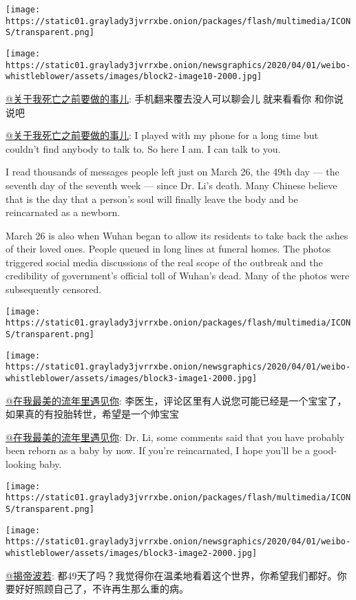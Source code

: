 \texttt{[image: https://static01.graylady3jvrrxbe.onion/packages/flash/multimedia/ICONS/transparent.png]}

\texttt{[image: https://static01.graylady3jvrrxbe.onion/newsgraphics/2020/04/01/weibo-whistleblower/assets/images/block2-image10-2000.jpg]}

\href{https://www.weibo.com/u/6036501960}{@关于我死亡之前要做的事儿}:
手机翻来覆去没人可以聊会儿 就来看看你 和你说说吧

\href{https://www.weibo.com/u/6036501960}{@关于我死亡之前要做的事儿}: I
played with my phone for a long time but couldn't find anybody to talk
to. So here I am. I can talk to you.

I read thousands of messages people left just on March 26, the 49th day
--- the seventh day of the seventh week --- since Dr. Li's death. Many
Chinese believe that is the day that a person's soul will finally leave
the body and be reincarnated as a newborn.

March 26 is also when Wuhan began to allow its residents to take back
the ashes of their loved ones. People queued in long lines at funeral
homes. The photos triggered social media discussions of the real scope
of the outbreak and the credibility of government's official toll of
Wuhan's dead. Many of the photos were subsequently censored.

\texttt{[image: https://static01.graylady3jvrrxbe.onion/packages/flash/multimedia/ICONS/transparent.png]}

\texttt{[image: https://static01.graylady3jvrrxbe.onion/newsgraphics/2020/04/01/weibo-whistleblower/assets/images/block3-image1-2000.jpg]}

\href{https://www.weibo.com/u/2002484133}{@在我最美的流年里遇见你}:
李医生，评论区里有人说您可能已经是一个宝宝了，如果真的有投胎转世，希望是一个帅宝宝

\href{https://www.weibo.com/u/2002484133}{@在我最美的流年里遇见你}: Dr.
Li, some comments said that you have probably been reborn as a baby by
now. If you're reincarnated, I hope you'll be a good-looking baby.

\texttt{[image: https://static01.graylady3jvrrxbe.onion/packages/flash/multimedia/ICONS/transparent.png]}

\texttt{[image: https://static01.graylady3jvrrxbe.onion/newsgraphics/2020/04/01/weibo-whistleblower/assets/images/block3-image2-2000.jpg]}

\href{https://www.weibo.com/u/2637030927?is_hot=1}{@揭帝波若}:
都49天了吗？我觉得你在温柔地看着这个世界，你希望我们都好。你要好好照顾自己了，不许再生那么重的病。

